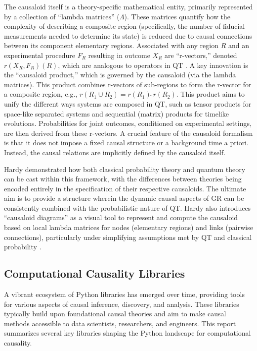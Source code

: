 {The causaloid itself is a theory-specific mathematical entity, primarily represented by a collection of ``lambda matrices'' (\(\Lambda\)). These matrices quantify how the complexity of describing a composite region (specifically, the number of fiducial measurements needed to determine its state) is reduced due to causal connections between its component elementary regions. Associated with any region $R$ and an experimental procedure $F_R$ resulting in outcome $X_R$ are ``r-vectors,'' denoted $r(X_R, F_R)(R)$, which are analogous to operators in QT \cite{HardyDynamicCausalStructure}. A key innovation is the ``causaloid product,'' which is governed by the causaloid (via the lambda matrices). This product combines r-vectors of sub-regions to form the r-vector for a composite region, e.g., $r(R_1 \cup R_2) = r(R_1) \hat{\;} r(R_2)$. This product aims to unify the different ways systems are composed in QT, such as tensor products for space-like separated systems and sequential (matrix) products for timelike evolutions. Probabilities for joint outcomes, conditioned on experimental settings, are then derived from these r-vectors. A crucial feature of the causaloid formalism is that it does not impose a fixed causal structure or a background time a priori. Instead, the causal relations are implicitly defined by the causaloid itself.

Hardy demonstrated how both classical probability theory and quantum theory can be cast within this framework, with the differences between theories being encoded entirely in the specification of their respective causaloids. The ultimate aim is to provide a structure wherein the dynamic causal aspects of GR can be consistently combined with the probabilistic nature of QT. Hardy also introduces ``causaloid diagrams'' as a visual tool to represent and compute the causaloid based on local lambda matrices for nodes (elementary regions) and links (pairwise connections), particularly under simplifying assumptions met by QT and classical probability \cite{HardyDynamicCausalStructure}.

\newpage

\subsection{Computational Causality Libraries}

A vibrant ecosystem of Python libraries has emerged over time, providing tools for various aspects of causal inference, discovery, and analysis. These libraries typically build upon foundational causal theories and aim to make causal methods accessible to data scientists, researchers, and engineers. This report summarizes several key libraries shaping the Python landscape for computational causality.

}
